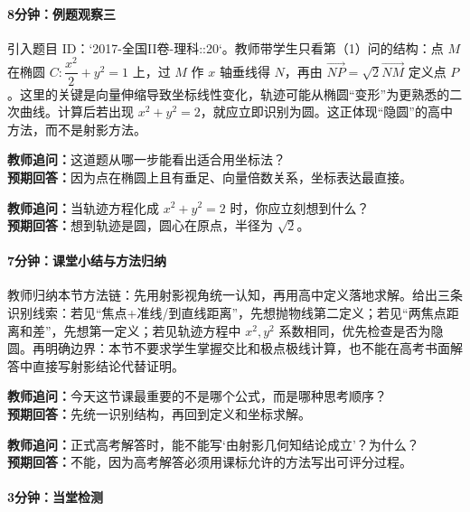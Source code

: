 \documentclass[UTF8,a4paper,11pt]{ctexart}
\begin{document}
\paragraph{8分钟：例题观察三}

引入题目 ID：`2017-全国II卷-理科::20`。教师带学生只看第（1）问的结构：点 $M$ 在椭圆 $C:\dfrac{x^2}{2}+y^2=1$ 上，过 $M$ 作 $x$ 轴垂线得 $N$，再由 $\overrightarrow{NP}=\sqrt{2}\overrightarrow{NM}$ 定义点 $P$。这里的关键是向量伸缩导致坐标线性变化，轨迹可能从椭圆“变形”为更熟悉的二次曲线。计算后若出现 $x^2+y^2=2$，就应立即识别为圆。这正体现“隐圆”的高中方法，而不是射影方法。

\noindent\textbf{教师追问：}这道题从哪一步能看出适合用坐标法？\\

\textbf{预期回答：}因为点在椭圆上且有垂足、向量倍数关系，坐标表达最直接。\par

\noindent\textbf{教师追问：}当轨迹方程化成 $x^2+y^2=2$ 时，你应立刻想到什么？\\

\textbf{预期回答：}想到轨迹是圆，圆心在原点，半径为 $\sqrt{2}$。\par

\paragraph{7分钟：课堂小结与方法归纳}

教师归纳本节方法链：先用射影视角统一认知，再用高中定义落地求解。给出三条识别线索：若见“焦点+准线/到直线距离”，先想抛物线第二定义；若见“两焦点距离和差”，先想第一定义；若见轨迹方程中 $x^2,y^2$ 系数相同，优先检查是否为隐圆。再明确边界：本节不要求学生掌握交比和极点极线计算，也不能在高考书面解答中直接写射影结论代替证明。

\noindent\textbf{教师追问：}今天这节课最重要的不是哪个公式，而是哪种思考顺序？\\

\textbf{预期回答：}先统一识别结构，再回到定义和坐标求解。\par

\noindent\textbf{教师追问：}正式高考解答时，能不能写‘由射影几何知结论成立’？为什么？\\

\textbf{预期回答：}不能，因为高考解答必须用课标允许的方法写出可评分过程。\par

\paragraph{3分钟：当堂检测}
\end{document}
